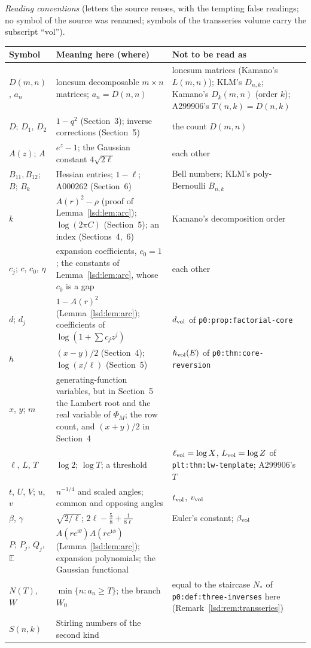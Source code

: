 \documentclass[11pt]{article}
\newcommand{\E}{\mathbb E}
\newcommand{\ii}{\mathrm i}
\theoremstyle{remark}\newtheorem{remark}{Remark}
\newcommand{\file}[1]{\nolinkurl{#1}}
\begin{document}
\medskip\noindent\begin{minipage}{\textwidth}
\emph{Reading conventions} (letters the source reuses, with the tempting false
readings; no symbol of the source was renamed; symbols of the transseries
volume carry the subscript ``vol'').\par
\smallskip
\begingroup\small\renewcommand{\arraystretch}{1.1}
\noindent\begin{tabular}{@{}>{\raggedright\arraybackslash}p{0.95in}>{\raggedright\arraybackslash}p{3.05in}>{\raggedright\arraybackslash}p{2.1in}@{}}
\toprule
Symbol & Meaning here (where) & Not to be read as\\
\midrule
$D(m,n)$, $a_n$ & lonesum decomposable $m\times n$ matrices; $a_n=D(n,n)$ & lonesum matrices (Kamano's $L(m,n)$); KLM's $D_{n,k}$; Kamano's $D_k(m,n)$ (order $k$); A299906's $T(n,k)=D(n,k)$\\
$D$; $D_1$, $D_2$ & $1-q^2$ (Section~3); inverse corrections (Section~5) & the count $D(m,n)$\\
$A(z)$; $A$ & $e^z-1$; the Gaussian constant $4\sqrt{2\ell}$ & each other\\
$B_{11},B_{12}$; $B$; $B_k$ & Hessian entries; $1-\ell$; A000262 (Section~6) & Bell numbers; KLM's poly-Bernoulli $B_{n,k}$\\
$k$ & $A(r)^2-\rho$ (proof of Lemma~\ref{lsd:lem:arc}); $\log(2\pi C)$ (Section~5); an index (Sections~4,~6) & Kamano's decomposition order\\
$c_j$; $c$, $c_0$, $\eta$ & expansion coefficients, $c_0=1$; the constants of Lemma~\ref{lsd:lem:arc}, whose $c_0$ is a gap & each other\\
$d$; $d_j$ & $1-A(r)^2$ (Lemma~\ref{lsd:lem:arc}); coefficients of $\log(1+\sum c_jz^j)$ & $d_{\rm vol}$ of \file{p0:prop:factorial-core}\\
$h$ & $(x-y)/2$ (Section~4); $\log(x/\ell)$ (Section~5) & $h_{\rm vol}(E)$ of \file{p0:thm:core-reversion}\\
$x$, $y$; $m$ & generating-function variables, but in Section~5 the Lambert root and the real variable of $\Phi_M$; the row count, and $(x+y)/2$ in Section~4 & \\
$\ell$, $L$, $T$ & $\log 2$; $\log T$; a threshold & $\ell_{\rm vol}=\log X$, $L_{\rm vol}=\log Z$ of \file{plt:thm:lw-template}; A299906's $T$\\
$t$, $U$, $V$; $u$, $v$ & $n^{-1/4}$ and scaled angles; common and opposing angles & $t_{\rm vol}$, $v_{\rm vol}$\\
$\beta$, $\gamma$ & $\sqrt{2/\ell}$; $2\ell-\tfrac58+\tfrac1{8\ell}$ & Euler's constant; $\beta_{\rm vol}$\\
$P$; $P_j$, $Q_j$, $\E$ & $A(re^{\ii\theta})A(re^{\ii\phi})$ (Lemma~\ref{lsd:lem:arc}); expansion polynomials; the Gaussian functional & \\
$N(T)$, $W$ & $\min\{n:a_n\ge T\}$; the branch $W_0$ & equal to the staircase $N_\ast$ of \file{p0:def:three-inverses} here (Remark~\ref{lsd:rem:transseries})\\
$S(n,k)$ & Stirling numbers of the second kind & \\
\bottomrule
\end{tabular}
\endgroup
\end{minipage}
\end{document}
